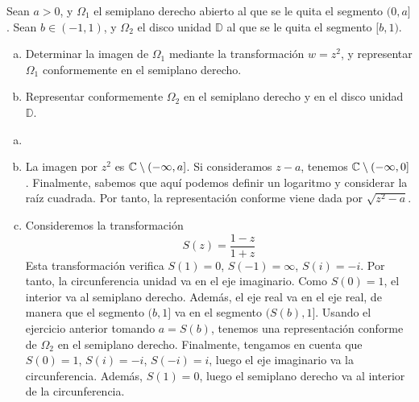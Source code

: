 \documentclass[twoside]{article}
\begin{document}
\begin{ejercicio}{13}
Sean $a>0$, y $\Omega_1$ el semiplano derecho abierto al que se le quita el segmento $(0,a]$. Sean $b\in(-1,1)$, y $\Omega_2$ el disco unidad $\mathbb{D}$ al que se le quita el segmento $[b,1)$.
\begin{enumerate}[(a)]
\item Determinar la imagen de $\Omega_1$ mediante la transformación $w=z^2$, y representar $\Omega_1$ conformemente en el semiplano derecho.
\item Representar conformemente $\Omega_2$ en el semiplano derecho y en el disco unidad $\mathbb{D}$.
\end{enumerate}
\end{ejercicio}
\begin{solucion}
\begin{enumerate}[(a)]
\item[]
\item La imagen por $z^2$ es $\mathbb{C}\setminus (-\infty,a]$. Si consideramos $z-a$, tenemos $\mathbb{C}\setminus (-\infty,0]$. Finalmente, sabemos que aquí podemos definir un logaritmo y considerar la raíz cuadrada. Por tanto, la representación conforme viene dada por $\sqrt{z^2-a}$.
\item Consideremos la transformación
$$
S(z)= \frac{1-z}{1+z}
$$
Esta transformación verifica $S(1)=0$, $S(-1)=\infty$, $S(i)=-i$. Por tanto, la circunferencia unidad va en el eje imaginario. Como $S(0)=1$, el interior va al semiplano derecho. Además, el eje real va en el eje real, de manera que el segmento $(b,1]$ va en el segmento $(S(b),1]$. Usando el ejercicio anterior tomando $a=S(b)$, tenemos una representación conforme de $\Omega_2$ en el semiplano derecho. Finalmente, tengamos en cuenta que $S(0)=1$, $S(i)=-i$, $S(-i)=i$, luego el eje imaginario va la circunferencia. Además, $S(1)=0$, luego el semiplano derecho va al interior de la circunferencia.
\end{enumerate}
\end{solucion}
\newpage
\end{document}
